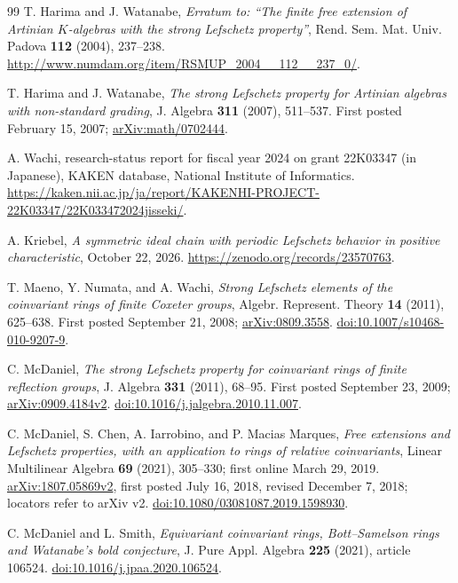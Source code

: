 \documentclass[11pt]{article}
\theoremstyle{definition}
\begin{document}
\begin{thebibliography}{99}
T. Harima and J. Watanabe,
\emph{Erratum to: ``The finite free extension of Artinian $K$-algebras with the strong Lefschetz property''},
Rend. Sem. Mat. Univ. Padova \textbf{112} (2004), 237--238.
\url{http://www.numdam.org/item/RSMUP_2004__112__237_0/}.

T. Harima and J. Watanabe,
\emph{The strong Lefschetz property for Artinian algebras with non-standard grading},
J. Algebra \textbf{311} (2007), 511--537.
First posted February 15, 2007;
\href{https://arxiv.org/abs/math/0702444}{arXiv:math/0702444}.

A. Wachi,
research-status report for fiscal year 2024 on grant 22K03347 (in Japanese),
KAKEN database, National Institute of Informatics.
\url{https://kaken.nii.ac.jp/ja/report/KAKENHI-PROJECT-22K03347/22K033472024jisseki/}.

A. Kriebel,
\emph{A symmetric ideal chain with periodic Lefschetz behavior in positive characteristic},
October 22, 2026.
\url{https://zenodo.org/records/23570763}.

T. Maeno, Y. Numata, and A. Wachi,
\emph{Strong Lefschetz elements of the coinvariant rings of finite Coxeter groups},
Algebr. Represent. Theory \textbf{14} (2011), 625--638.
First posted September 21, 2008;
\href{https://arxiv.org/abs/0809.3558}{arXiv:0809.3558}.
\href{https://doi.org/10.1007/s10468-010-9207-9}{doi:10.1007/s10468-010-9207-9}.

C. McDaniel,
\emph{The strong Lefschetz property for coinvariant rings of finite reflection groups},
J. Algebra \textbf{331} (2011), 68--95.
First posted September 23, 2009;
\href{https://arxiv.org/abs/0909.4184v2}{arXiv:0909.4184v2}.
\href{https://doi.org/10.1016/j.jalgebra.2010.11.007}{doi:10.1016/j.jalgebra.2010.11.007}.

C. McDaniel, S. Chen, A. Iarrobino, and P. Macias Marques,
\emph{Free extensions and Lefschetz properties, with an application to rings of relative coinvariants},
Linear Multilinear Algebra \textbf{69} (2021), 305--330; first online March 29, 2019.
\href{https://arxiv.org/abs/1807.05869v2}{arXiv:1807.05869v2},
first posted July 16, 2018, revised December 7, 2018; locators refer to
arXiv v2.
\href{https://doi.org/10.1080/03081087.2019.1598930}{doi:10.1080/03081087.2019.1598930}.

C. McDaniel and L. Smith,
\emph{Equivariant coinvariant rings, Bott--Samelson rings and Watanabe's bold conjecture},
J. Pure Appl. Algebra \textbf{225} (2021), article 106524.
\href{https://doi.org/10.1016/j.jpaa.2020.106524}{doi:10.1016/j.jpaa.2020.106524}.


\end{thebibliography}
\end{document}

